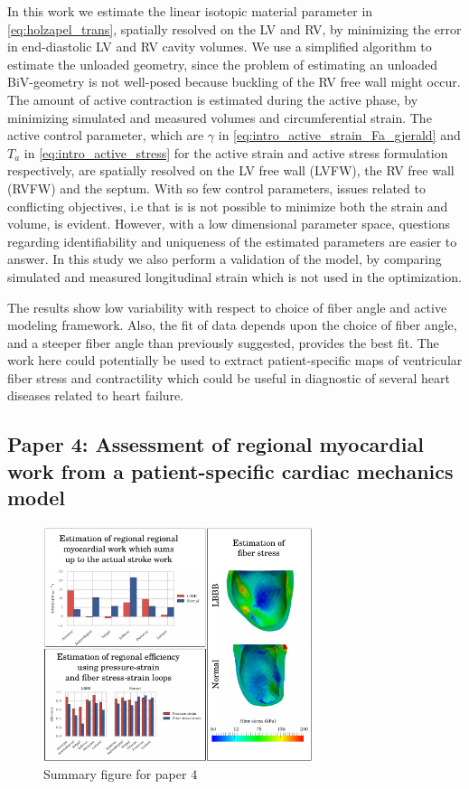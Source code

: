 In this work we estimate the linear isotopic material parameter in
\eqref{eq:holzapel_trans}, spatially resolved on the LV and RV, by
minimizing the error in end-diastolic LV and RV cavity volumes.
We use a simplified algorithm to estimate the unloaded geometry, since
the problem of estimating an unloaded BiV-geometry is not well-posed
because buckling of the RV free wall might occur. The amount of active
contraction is estimated during the active phase, by minimizing
simulated and measured volumes and circumferential strain. The active
control parameter, which are $\gamma$ in
\eqref{eq:intro_active_strain_Fa_gjerald}  and $T_a$ in
\eqref{eq:intro_active_stress} for the active strain and active stress
formulation respectively, are spatially resolved on the
LV free wall (LVFW), the RV free wall (RVFW) and the septum. With so
few control parameters, issues related to conflicting objectives, i.e
that is is not possible to minimize both the strain and volume, is
evident. However, with a low dimensional parameter space, questions
regarding identifiability and uniqueness of the estimated parameters
are easier to answer. In this study we also perform a validation of
the model, by comparing simulated and measured longitudinal strain
which is not used in the optimization. 

The results show low variability with respect to choice of fiber angle
and active modeling framework. Also, the fit of data depends upon the
choice of fiber angle, and a steeper fiber angle than previously
suggested, provides the best fit. The work here could potentially be
used to extract patient-specific maps of ventricular fiber stress and
contractility which could be useful in diagnostic of several heart
diseases related to heart failure. 




\subsection{Paper 4: Assessment of regional myocardial work from a
  patient-specific cardiac mechanics model}

\begin{figure}[htbp]
  \centering
    \includegraphics[width=0.7\textwidth]{chapters/introduction/figures/paper4}
\caption{Summary figure for paper 4}
\label{fig:paper3}
\end{figure}


